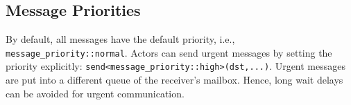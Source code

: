
\clearpage
\subsection{Message Priorities}

By default, all messages have the default priority, i.e.,
\lstinline^message_priority::normal^. Actors can send urgent messages by
setting the priority explicitly:
\lstinline^send<message_priority::high>(dst,...)^. Urgent messages are put into
a different queue of the receiver's mailbox. Hence, long wait delays can be
avoided for urgent communication.

